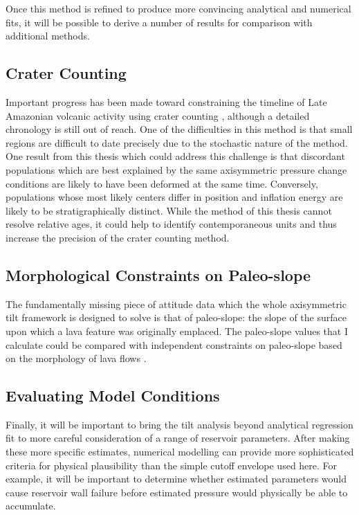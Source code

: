 Once this method is refined to produce more convincing analytical and numerical fits, it will be possible to derive a number of results for comparison with additional methods.

\subsection{Crater Counting}
Important progress has been made toward constraining the timeline of Late Amazonian volcanic activity using crater counting \parencite{kneissl_map-projection-independent_2011,robbins_volcanic_2011,
robbins_large_2013,
platz_crater-based_2013}, although a detailed chronology is still out of reach. One of the difficulties in this method is that small regions are difficult to date precisely due to the stochastic nature of the method. One result from this thesis which could address this challenge is that discordant populations which are best explained by the same axisymmetric pressure change conditions are likely to have been deformed at the same time. Conversely, populations whose most likely centers differ in position and inflation energy are likely to be stratigraphically distinct. While the method of this thesis cannot resolve relative ages, it could help to identify contemporaneous units and thus increase the precision of the crater counting method.

\subsection{Morphological Constraints on Paleo-slope}

The fundamentally missing piece of attitude data which the whole axisymmetric tilt framework is designed to solve is that of paleo-slope: the slope of the surface upon which a lava feature was originally emplaced. The paleo-slope values that I calculate could be compared with independent constraints on paleo-slope based on the morphology of lava flows \parencite{wadge_lobes_1991, peitersen_correlations_2000, peters_lava_2021}.

\subsection{Evaluating Model Conditions}

Finally, it will be important to bring the tilt analysis beyond analytical regression fit to more careful consideration of a range of reservoir parameters. After making these more specific estimates, numerical modelling can provide more sophisticated criteria for physical plausibility than the simple cutoff envelope used here. For example, it will be important to determine whether estimated parameters would cause reservoir wall failure before estimated pressure would physically be able to accumulate. 